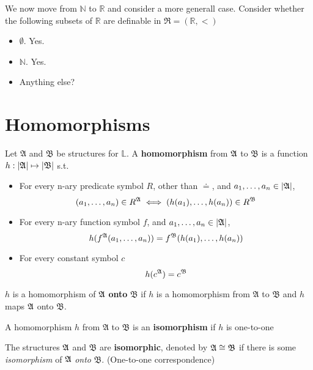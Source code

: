 We now move from $\mathbb{N}$ to $\mathbb{R}$ and consider a more generall case. Consider whether the following subsets of $\mathbb{R}$ are definable in $\mathfrak{R} = (\mathbb{R}, <)$

\begin{itemize}
    \item $\emptyset$. Yes.
    \item $\mathbb{N}$. Yes.
    \item Anything else?
\end{itemize}

\section{Homomorphisms}

\begin{definition}[Homomorphism]
    Let $\mathfrak{A}$ and $\mathfrak{B}$ be structures for $\mathbb{L}$. A \textbf{homomorphism} from $\mathfrak{A}$ to $\mathfrak{B}$ is a function $h:|\mathfrak{A}| \mapsto |\mathfrak{B}|$ s.t.
    \begin{itemize}
        \item For every n-ary predicate symbol $R$, other than $\doteq$, and $a_1,\dots,a_n \in |\mathfrak{A}|$,
        \[ (a_1,\dots,a_n) \in R^{\mathfrak{A}} \iff (h(a_1),\dots,h(a_n))\in R^{\mathfrak{B}} \]
        \item For every n-ary function symbol $f$, and $a_1,\dots,a_n \in |\mathfrak{A}|$,
        \[ h(f^{\mathfrak{A}}(a_1,\dots,a_n)) = f^\mathfrak{B}(h(a_1),\dots,h(a_n)) \]
        \item For every constant symbol $c$
        \[ h(c^{\mathfrak{A}}) = c^\mathfrak{B} \]
    \end{itemize}
\end{definition}

\begin{definition}
    $h$ is a homomorphism of $\mathfrak{A}$ \textbf{onto} $\mathfrak{B}$ if $h$ is a homomorphism from $\mathfrak{A}$ to $\mathfrak{B}$ and $h$ maps $\mathfrak{A}$ onto $\mathfrak{B}$.
\end{definition}

\begin{definition}[Isomorphism]
    A homomorphism $h$ from $\mathfrak{A}$ to $\mathfrak{B}$ is an \textbf{isomorphism} if $h$ is one-to-one
\end{definition}

\begin{definition}[Isomorphic]
    The structures $\mathfrak{A}$ and $\mathfrak{B}$ are \textbf{isomorphic}, denoted by $\mathfrak{A} \cong \mathfrak{B}$ if there is some \emph{isomorphism} of $\mathfrak{A}$ \emph{onto} $\mathfrak{B}$. (One-to-one correspondence)
\end{definition}

